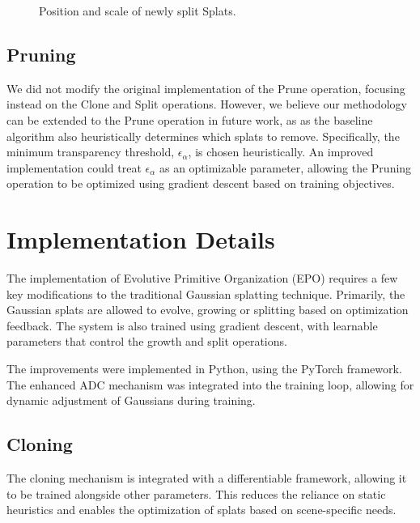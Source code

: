 \documentclass[11pt]{report}
\begin{document}
\begin{figure}[H]
    \centering
    
    \caption{Position and scale of newly split Splats.}
    \label{fig:split}
\end{figure}

\subsection{Pruning}
\label{subsec:improved_pruning}
We did not modify the original implementation of the Prune operation, focusing instead on the Clone and Split operations. However, we believe our methodology can be extended to the Prune operation in future work, as as the baseline algorithm also heuristically determines which splats to remove. Specifically, the minimum transparency threshold, $\epsilon_{\alpha}$, is chosen heuristically. An improved implementation could treat $\epsilon_{\alpha}$ as an optimizable parameter, allowing the Pruning operation to be optimized using gradient descent based on training objectives.

\section{Implementation Details}
The implementation of Evolutive Primitive Organization (EPO) requires a few key modifications to the traditional Gaussian splatting technique. Primarily, the Gaussian splats are allowed to evolve, growing or splitting based on optimization feedback. The system is also trained using gradient descent, with learnable parameters that control the growth and split operations.

The improvements were implemented in Python, using the PyTorch framework. The enhanced ADC mechanism was integrated into the training loop, allowing for dynamic adjustment of Gaussians during training.

\subsection{Cloning}

The cloning mechanism is integrated with a differentiable framework, allowing it to be trained alongside other parameters. This reduces the reliance on static heuristics and enables the optimization of splats based on scene-specific needs.
\end{document}
